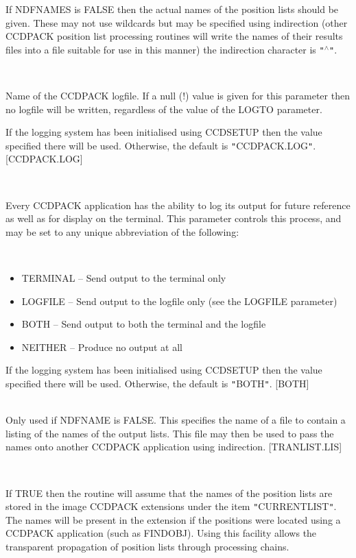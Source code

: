 \documentclass[twoside,11pt]{article}
\newcommand{\htmlref}[2]{#1}
\renewcommand{\_}{\texttt{\symbol{95}}}
\newcommand{\qt}[1]{{\tt "}#1{\tt "}}
\newcommand{\xroutine}[1]{\htmlref{{\sc #1}}{#1}}
\newcommand{\sstsubsection}[1]{ \item[{#1}] \mbox{} \\}
\newcommand{\sstitemlist}[1]{
  \mbox{} \\
  \vspace{-3.5ex}
  \begin{itemize}
     #1
  \end{itemize}
}
\newcommand{\sstitem}{\item}
\newcommand{\sstsubsection}[1]{\item[{#1}]}
\newcommand{\sstitemlist}[1]{
      \begin{itemize}
         #1
      \end{itemize}
      \\
   }
\newcommand{\sstitem}{\item}
\begin{document}
{{{         If NDFNAMES is FALSE then the actual names of the position
         lists should be given. These may not use wildcards but may be
         specified using indirection (other CCDPACK position list
         processing routines will write the names of their results
         files into a file suitable for use in this manner) the
         indirection character is \qt{$^\wedge$}.
      }
      \sstsubsection{
         LOGFILE = FILENAME (Read)
      }{
         Name of the CCDPACK logfile.  If a null (!) value is given for
         this parameter then no logfile will be written, regardless of
         the value of the LOGTO parameter.

         If the logging system has been initialised using \xroutine{CCDSETUP}
         then the value specified there will be used. Otherwise, the
         default is \qt{CCDPACK.LOG}.
         [CCDPACK.LOG]
      }
      \sstsubsection{
         LOGTO = LITERAL (Read)
      }{
         Every CCDPACK application has the ability to log its output
         for future reference as well as for display on the terminal.
         This parameter controls this process, and may be set to any
         unique abbreviation of the following:
         \sstitemlist{

            \sstitem
               TERMINAL  -- Send output to the terminal only

            \sstitem
               LOGFILE   -- Send output to the logfile only (see the
                               LOGFILE parameter)

            \sstitem
               BOTH      -- Send output to both the terminal and the
                               logfile

            \sstitem
               NEITHER   -- Produce no output at all

         }
         If the logging system has been initialised using \xroutine{CCDSETUP}
         then the value specified there will be used. Otherwise, the
         default is \qt{BOTH}.
         [BOTH]
      }
      \sstsubsection{
         NAMELIST = \_FILENAME
      }{
         Only used if NDFNAME is FALSE. This specifies the name of a
         file to contain a listing of the names of the output lists.
         This file may then be used to pass the names onto another
         CCDPACK application using indirection.
         [TRANLIST.LIS]
      }
      \sstsubsection{
         NDFNAMES = \_LOGICAL (Read)
      }{
         If TRUE then the routine will assume that the names of the
         position lists are stored in the image CCDPACK extensions under
         the item \qt{CURRENT\_LIST}. The names will be present in the
         extension if the positions were located using a CCDPACK
         application (such as \xroutine{FINDOBJ}). Using this facility allows the
         transparent propagation of position lists through processing
         chains.

}}}
\end{document}
